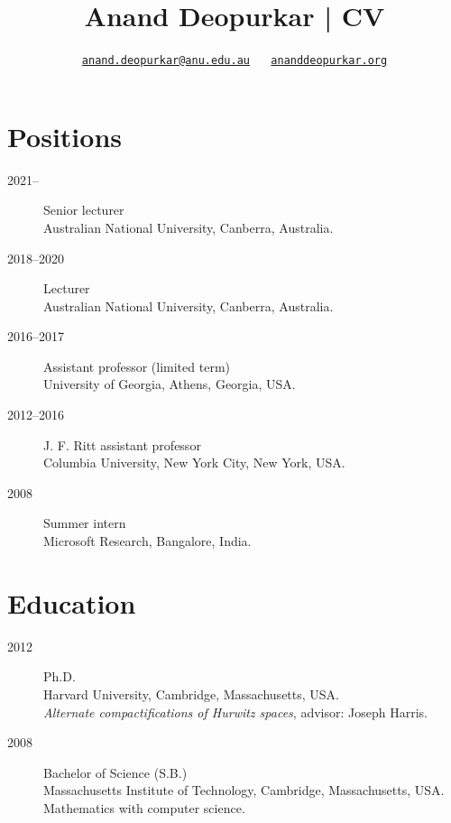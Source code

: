 \documentclass[11pt]{article}
\author{\href{mailto:anand.deopurkar@anu.edu.au}{\texttt{anand.deopurkar@anu.edu.au}} \(\quad\) \href{https://www.ananddeopurkar.org}{\texttt{ananddeopurkar.org}}}
\date{}
\title{Anand Deopurkar | CV}
\begin{document}
\maketitle
\section*{Positions}
\label{sec:org53a3900}
\label{org749abb5}
\begin{description}
\item[{2021--}] Senior lecturer\\
Australian National University, Canberra, Australia.
\item[{2018--2020}] Lecturer\\
Australian National University, Canberra, Australia.
\item[{2016--2017}] Assistant professor (limited term)\\
University of Georgia, Athens, Georgia, USA.
\item[{2012--2016}] J. F. Ritt assistant professor\\
Columbia University, New York City, New York, USA.
\item[{2008}] Summer intern\\
Microsoft Research, Bangalore, India.
\end{description}
\section*{Education}
\label{sec:orgdf3c5db}

\label{org3add804}
\begin{description}
\item[{2012}] Ph.D.\\
Harvard University, Cambridge, Massachusetts, USA.\\
      \emph{Alternate compactifications of Hurwitz spaces}, advisor: Joseph Harris.
\item[{2008}] Bachelor of Science (S.B.)\\
Massachusetts Institute of Technology, Cambridge, Massachusetts, USA.\\
      Mathematics with computer science.
\end{description}
\end{document}
